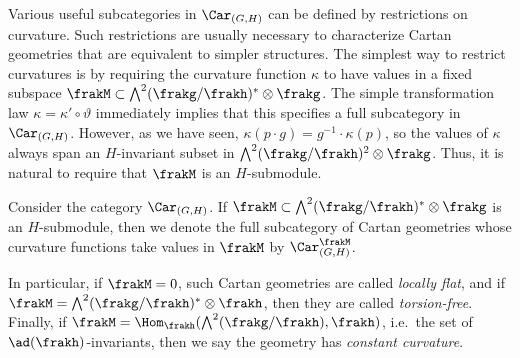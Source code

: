 Various useful subcategories in $\Car_{(G,H)}$ can be defined by restrictions on curvature. Such restrictions are usually necessary to characterize Cartan geometries that are equivalent to simpler structures. The simplest way to restrict curvatures is by requiring the curvature function $\kappa$ to have values in a fixed subspace $\frakM\subset \bigwedge^2(\frakg\slash\frakh)^\ast\otimes\frakg$. The simple transformation law $\kappa=\kappa'\circ \vartheta$ immediately implies that this specifies a full subcategory in $\Car_{(G,H)}$. However, as we have seen, $\kappa(p\cdot g)=g^{-1}\cdot \kappa(p)$, so the values of $\kappa$ always span an $H$-invariant subset in $\bigwedge^2(\frakg\slash\frakh)^2\otimes\frakg$. Thus, it is natural to require that $\frakM$ is an $H$-submodule. 

\begin{defn}\label{def category of cartan geom}
    Consider the category $\Car_{(G,H)}$. If $\frakM\subset \bigwedge^2(\frakg\slash\frakh)^\ast\otimes\frakg$ is an $H$-submodule, then we denote the full subcategory of Cartan geometries whose curvature functions take values in $\frakM$ by $\Car_{(G,H)}^\frakM$.

    In particular, if $\frakM=0$, such Cartan geometries are called \emph{locally flat}, and if $\frakM=\bigwedge^2(\frakg\slash\frakh)^\ast\otimes\frakh$, then they are called \emph{torsion-free}. Finally, if $\frakM=\Hom_\frakh(\bigwedge^2(\frakg\slash\frakh), \frakh)$, i.e.\ the set of $\ad(\frakh)$-invariants, then we say the geometry has \emph{constant curvature}.
\end{defn}


